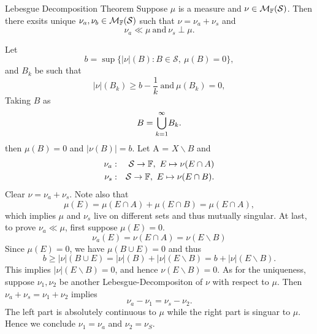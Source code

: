 \begin{stheorem}{Lebesgue Decomposition Theorem}{}
Suppose $\mu$ is a measure and $\nu \in \mathcal{M}_{\mathbb{F}}(\mathcal S)$. Then there exsits unique $\nu_a,\nu_b \in \mathcal{M}_{\mathbb{F}}(\mathcal S)$ such that $\nu=\nu_a+\nu_s$ and 
$$
\nu_a \ll \mu \ \text{and} \ \nu_s \perp \mu.
$$
\end{stheorem}
\begin{Proof}
Let 
$$
b = \sup \{ |\nu|(B): B\in \mathcal S, \ \mu(B) = 0\},
$$
and $B_k$ be such that 
$$
|\nu|(B_k)\geq b -\frac{1}{k} \ \text{and} \ \mu(B_k)=0,
$$
Taking $B$ as 
$$
B = {\bigcup_{k=1}^{\infty}}B_k.
$$
then $\mu(B)=0$ and $|\nu(B)|=b$. Let A = $X\backslash B$ and 
\begin{eqnarray*}
	\nu_a &:& \mathcal S \to \mathbb{F}, \ E\mapsto \nu(E\cap A) \\
	\nu_s &:& \mathcal S \to \mathbb{F}, \ E\mapsto \nu(E\cap B).
\end{eqnarray*}
Clear $\nu = \nu_a + \nu_s$. Note also that 
$$
\mu(E) = \mu(E\cap A) + \mu(E \cap B) = \mu(E \cap A),
$$
which implies $\mu$ and $\nu_s$ live on different sets and thus mutually singular.
At last, to prove $\nu_a \ll \mu$, first suppose $\mu(E)=0$.
$$
\nu_a(E) = \nu(E\cap A) = \nu(E\backslash B)
$$
Since $\mu(E)=0$, we have $\mu(B\cup E)=0$ and thus
$$
b\geq |\nu|(B\cup E) = |\nu|(B) + |\nu|(E\backslash B) = b + |\nu|(E\backslash B).
$$
This implies $|\nu|(E\backslash B)=0$, and hence $\nu(E\backslash B)=0$.
As for the uniqueness, suppose $\nu_1,\nu_2$ be another Lebesgue-Decompositon of $\nu$ with respect to $\mu$. Then $\nu_a + \nu_s = \nu_1 + \nu_2$ implies
$$
\nu_a - \nu_1 = \nu_s - \nu_2.
$$
The left part is absolutely continuous to $\mu$ while the right part is singuar to $\mu$. 
Hence we conclude $\nu_1=\nu_a$ and $\nu_2=\nu_S$.
\end{Proof}







